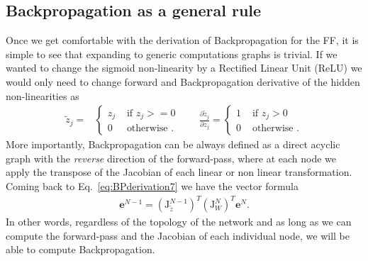 \subsection{Backpropagation as a general rule}
%
Once we get comfortable with the derivation of Backpropagation for the FF, it is simple to see that expanding to generic computations graphs is trivial. If we wanted to change the sigmoid non-linearity by a Rectified Linear Unit (ReLU) we would only need to change forward and Backpropagation derivative of the hidden non-linearities as
\begin{align}
 \tilde{z}_j =
  &\begin{cases}
      z_j  &  \mbox{ if } z_j >= 0\\
      0  &  \mbox{ otherwise }.
  \end{cases} \quad \quad \frac{\partial \tilde{z}_{j}}{\partial z_{j}} = \begin{cases}
      1  &  \mbox{ if } z_j > 0\\
      0  &  \mbox{ otherwise }.
  \end{cases}
  \label{eqn:relu}
\end{align}
%
More importantly, Backpropagation can be always defined as a direct acyclic graph with the \textit{reverse} direction of the forward-pass, where at each node we apply the transpose of the Jacobian of each linear or non linear transformation. Coming back to Eq.~\ref{eq:BPderivation7} we have the vector formula
%
\begin{align}
        \mathbf{e}^{N-1} = \left(\mathbf{\mathrm{J}}_{\tilde{z}}^{N-1}\right)^T \left(\mathbf{\mathrm{J}}_{W}^N\right)^T \mathbf{e}^N.
\label{eq:BPderivation5}
\end{align}
%
In other words, regardless of the topology of the network and as long as we can compute the forward-pass and the Jacobian of each individual node, we will be able to compute Backpropagation.
